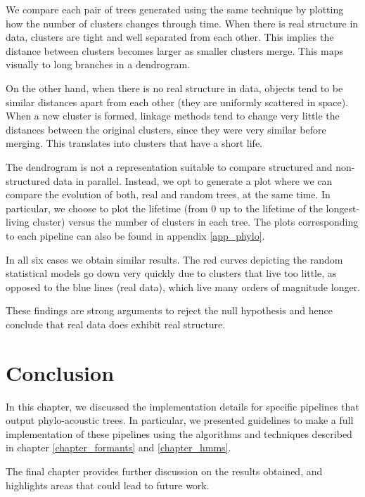\documentclass[../main.tex]{subfiles}
\begin{document}
\par We compare each pair of trees generated using the same technique by plotting how the number of clusters changes through time. When there is real structure in data, clusters are tight and well separated from each other. This implies the distance between clusters becomes larger as smaller clusters merge. This maps visually to long branches in a dendrogram. 
\par On the other hand, when there is no real structure in data, objects tend to be similar distances apart from each other (they are uniformly scattered in space). When a new cluster is formed, linkage methods tend to change very little the distances between the original clusters, since they were very similar before merging. This translates into clusters that have a short life.
\par The dendrogram is not a representation suitable to compare structured and non-structured data in parallel. Instead, we opt to generate a plot where we can compare the evolution of both, real and random trees, at the same time. In particular, we choose to plot the lifetime (from 0 up to the lifetime of the longest-living cluster) versus the number of clusters in each tree. The plots corresponding to each pipeline can also be found in appendix \ref{app_phylo}.
\par In all six cases we obtain similar results. The red curves depicting the random statistical models go down very quickly due to clusters that live too little, as opposed to the blue lines (real data), which live many orders of magnitude longer.
\par These findings are strong arguments to reject the null hypothesis and hence conclude that real data does exhibit real structure.
\section{Conclusion}
In this chapter, we discussed the implementation details for specific pipelines that output phylo-acoustic trees. In particular, we presented guidelines to make a full implementation of these pipelines using the algorithms and techniques described in chapter \ref{chapter_formants} and \ref{chapter_hmms}.
\par The final chapter provides further discussion on the results obtained, and highlights areas that could lead to future work.
\end{document}
